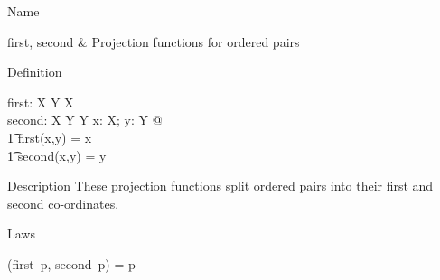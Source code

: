 \begin{manpage}\label{p:70}
\item[Name]
\begin{name}
     first, second %
        & Projection functions for ordered pairs
\end{name}

\item[Definition]

\begin{gendef}[X,Y]
        first: X \cross Y \fun X \\
        second: X \cross Y \fun Y
\where
        \forall x: X; y: Y @ \\
\t1         first(x,y) = x \land \\
\t1         second(x,y) = y
\end{gendef}

\item[Description]
These projection functions split ordered pairs into their first and second
co-ordinates.

\item[Laws]
\begin{laws}
        (first~p, second~p) = p
\end{laws}
\end{manpage}

